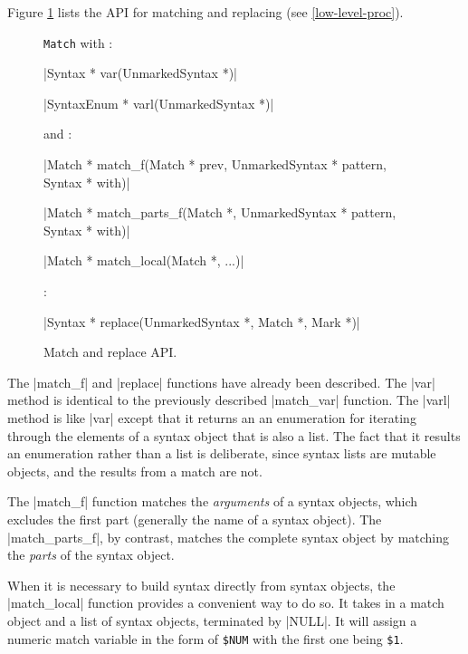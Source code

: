 Figure \ref{match-api} lists the API for matching and replacing (see
\ref{low-level-proc}).
\begin{figure}
\begin{apil}
\item {} \verb/Match/ with :
\begin{apill}
\item |Syntax * var(UnmarkedSyntax *)|
\item |SyntaxEnum * varl(UnmarkedSyntax *)|
\end{apill}
and :
\begin{apill}
\item |Match * match_f(Match * prev, UnmarkedSyntax * pattern, Syntax * with)|
\item |Match * match_parts_f(Match *, UnmarkedSyntax * pattern, Syntax * with)|
\item |Match * match_local(Match *, ...)|
\end{apill}
\item {}:
\begin{apill}
\item |Syntax * replace(UnmarkedSyntax *, Match *, Mark *)|
\end{apill}
\end{apil}
\caption{Match and replace API.}
\label{match-api}
\end{figure}
The |match_f| and |replace| functions have already been
described.  The |var| method is identical to the previously described
|match_var| function.  The |varl| method is like |var| except that it
returns an an enumeration for iterating through the elements of a
syntax object that is also a list.  The fact that it results an
enumeration rather than a list is deliberate, since syntax lists are
mutable objects, and the results from a match are not.  


The |match_f| function matches the \textit{arguments} of a syntax
objects, which excludes the first part (generally the name of a syntax
object).  The |match_parts_f|, by contrast, matches the complete
syntax object by matching the \textit{parts} of the syntax object.

When it is necessary to build syntax directly from syntax objects, the
|match_local| function provides a convenient way to do so.  It takes
in a match object and a list of syntax objects, terminated by
|NULL|.  It will assign a numeric match variable in the form of
\verb|$NUM| with the first one being \verb|$1|.

